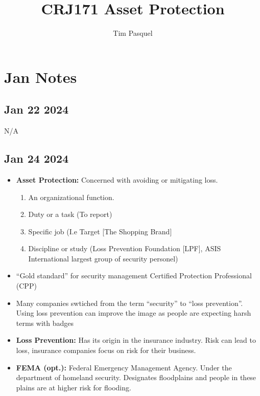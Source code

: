 \documentclass[12pt]{article}
\author{Tim Pasquel}
\title{CRJ171 Asset Protection}
\begin{document}
\maketitle

\titlepage

\section{Jan Notes}

\subsection*{Jan 22 2024}

N/A

\subsection*{Jan 24 2024}

\begin{itemize}
		  \item \textbf{Asset Protection:} Concerned with avoiding or mitigating loss. 
					 \begin{enumerate}
					 		\item An organizational function.
							\item Duty or a task (To report)
							\item Specific job (I.e Target [The Shopping Brand]
							\item Discipline or study (Loss Prevention Foundation [LPF],
									  ASIS International largest group of security personel)

					 \end{enumerate}
		  \item ``Gold standard'' for security management Certified Protection Professional
					(CPP)
		  \item Many companies swtiched from the term ``security'' to ``loss prevention''. Using
					 loss prevention can improve the image as people are expecting harsh terms with badges
		  \item \textbf{Loss Prevention:} Has its origin in the insurance industry. 
					 Risk can lead to loss, insurance companies focus on risk for their business.
		  \item \textbf{FEMA (opt.):} Federal Emergency Management Agency. Under the department of
					 homeland security. Designates floodplains and people in these plains are
					 at higher risk for flooding. 
\end{itemize}
\end{document}
